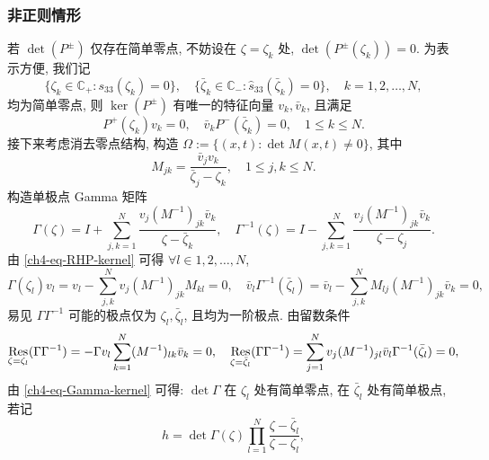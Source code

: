 \subsubsection{非正则情形}
若 $\det(P^{\pm})$ 仅存在简单零点, 不妨设在 $\zeta = \zeta_{k}$ 处, $\det(P^{\pm}(\zeta_{k})) = 0$. 为表示方便, 我们记
\begin{equation}
    \{\zeta_{k} \in \mathbb{C}_{+} : s_{33}(\zeta_{k}) = 0\}, \quad
    \{\bar{\zeta}_{k} \in \mathbb{C}_{-} : \hat{s}_{33}(\bar{\zeta}_{k}) = 0\},\quad k = 1, 2, \ldots, N,
\end{equation}
均为简单零点, 则 $\ker(P^{\pm})$ 有唯一的特征向量 $v_{k}, \bar{v}_{k}$, 且满足
\begin{equation}
    P^{+}(\zeta_{k}) v_{k} = 0, \quad \bar{v}_{k} P^{-}(\bar{\zeta}_{k}) = 0, \quad 1 \leq k \leq N.
    \label{ch4-eq-RHP-kernel}
\end{equation}
接下来考虑消去零点结构, 构造 $\Omega := \{(x,t): \det M(x,t) \neq 0\}$, 其中
\begin{equation}
    M_{jk} = \frac{\bar{v}_{j} v_{k}}{\bar{\zeta}_{j} - \zeta_{k}}, \quad 1 \leq j,k \leq N.
\end{equation}
构造单极点 Gamma 矩阵
\begin{equation}
    \Gamma(\zeta) = I + \sum_{j,k = 1}^{N} \frac{v_{j} (M^{-1})_{jk} \bar{v}_{k}}{\zeta - \bar{\zeta}_{k}}, \quad
    \Gamma^{-1}(\zeta) = I - \sum_{j,k = 1}^{N} \frac{v_{j} (M^{-1})_{jk} \bar{v}_{k}}{\zeta - \zeta_{j}}.
    \label{ch4-eq-Gamma-N}
\end{equation}
由 \eqref{ch4-eq-RHP-kernel} 可得 $\forall l \in 1, 2, \ldots, N$,
\begin{equation}
    \Gamma(\zeta_{l}) v_{l} = v_{l} - \sum_{j,k}^{N} v_{j} (M^{-1})_{jk} M_{kl} = 0, \quad
    \bar{v}_{l} \Gamma^{-1}(\bar{\zeta}_{l}) = \bar{v}_{l} - \sum_{j,k}^{N} M_{lj} (M^{-1})_{jk} \bar{v}_{k} = 0,
    \label{ch4-eq-Gamma-kernel}
\end{equation}
易见 $\Gamma \Gamma^{-1}$ 可能的极点仅为 $\zeta_{l}, \bar{\zeta}_{l}$, 且均为一阶极点. 由留数条件
\begin{equation}
    \operatorname*{Res}_{\zeta = \zeta_{l}}(\Gamma \Gamma^{-1}) = - \Gamma v_{l} \sum_{k = 1}^{N} (M^{-1})_{lk} \bar{v}_{k} = 0, \quad \operatorname*{Res}_{\zeta = \bar{\zeta}_{l}}(\Gamma \Gamma^{-1}) = \sum_{j = 1}^{N} v_{j} (M^{-1})_{jl} \bar{v}_{l} \Gamma^{-1}(\bar{\zeta}_{l}) = 0,
\end{equation}
由 \eqref{ch4-eq-Gamma-kernel} 可得: $\det \Gamma$ 在 $\zeta_{l}$ 处有简单零点, 在 $\bar{\zeta}_{l}$ 处有简单极点, 若记
\begin{equation}
    h = \det \Gamma(\zeta) \prod_{l=1}^{N} \frac{\zeta - \bar{\zeta}_{l}}{\zeta - \zeta_{l}},
\end{equation}
